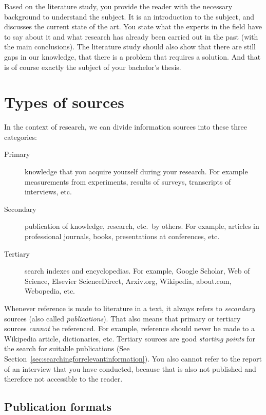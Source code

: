 Based on the literature study, you provide the reader with the necessary background to understand the subject. It is an introduction to the subject, and discusses the current state of the art. You state what the experts in the field have to say about it and what research has already been carried out in the past (with the main conclusions). The literature study should also show that there are still gaps in our knowledge, that there is a problem that requires a solution. And that is of course exactly the subject of your bachelor's thesis.

\section{Types of sources}
\label{sec:typessources}

In the context of research, we can divide information sources into these three categories:

\begin{description}
 \item[Primary] knowledge that you acquire yourself during your research. For example measurements from experiments, results of surveys, transcripts of interviews, etc.
 \item[Secondary] publication of knowledge, research, etc.~by others. For example, articles in professional journals, books, presentations at conferences, etc.
 \item[Tertiary] search indexes and encyclopedias. For example, Google Scholar, Web of Science, Elsevier ScienceDirect, Arxiv.org, Wikipedia, about.com, Webopedia, etc.
\end{description}

Whenever reference is made to literature in a text, it always refers to \emph{secondary} sources (also called \emph{publications}). That also means that primary or tertiary sources \emph{cannot} be referenced. For example, reference should never be made to a Wikipedia article, dictionaries, etc. Tertiary sources are good \textit{starting points} for the search for suitable publications (See Section~\ref{sec:searchingforrelevantinformation}). You also cannot refer to the report of an interview that you have conducted, because that is also not published and therefore not accessible to the reader.

\subsection{Publication formats}
\label{sub:publicationformats}

